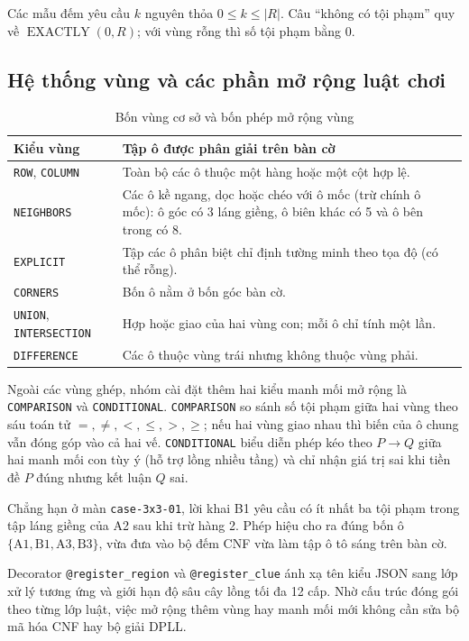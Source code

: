 Các mẫu đếm yêu cầu $k$ nguyên thỏa $0\le k\le |R|$. Câu “không có tội phạm” quy về $\operatorname{EXACTLY}(0,R)$; với vùng rỗng thì số tội phạm bằng 0.

\clearpage

\subsection{Hệ thống vùng và các phần mở rộng luật chơi}

\begin{table}[H]
\centering\small\singlespacing
\caption{Bốn vùng cơ sở và bốn phép mở rộng vùng}
\smallskip
\renewcommand{\arraystretch}{1.23}
\begin{tabularx}{\linewidth}{@{}l >{\raggedright\arraybackslash}X@{}}
\toprule
\textbf{Kiểu vùng} & \textbf{Tập ô được phân giải trên bàn cờ} \\
\midrule
\texttt{ROW}, \texttt{COLUMN} & Toàn bộ các ô thuộc một hàng hoặc một cột hợp lệ. \\
\texttt{NEIGHBORS} & Các ô kề ngang, dọc hoặc chéo với ô mốc (trừ chính ô mốc): ô góc có 3 láng giềng, ô biên khác có 5 và ô bên trong có 8. \\
\texttt{EXPLICIT} & Tập các ô phân biệt chỉ định tường minh theo tọa độ (có thể rỗng). \\
\texttt{CORNERS} & Bốn ô nằm ở bốn góc bàn cờ. \\
\texttt{UNION}, \texttt{INTERSECTION} & Hợp hoặc giao của hai vùng con; mỗi ô chỉ tính một lần. \\
\texttt{DIFFERENCE} & Các ô thuộc vùng trái nhưng không thuộc vùng phải. \\
\bottomrule
\end{tabularx}
\end{table}

Ngoài các vùng ghép, nhóm cài đặt thêm hai kiểu manh mối mở rộng là \texttt{COMPARISON} và \texttt{CONDITIONAL}. \texttt{COMPARISON} so sánh số tội phạm giữa hai vùng theo sáu toán tử $=,\ne,<,\le,>,\ge$; nếu hai vùng giao nhau thì biến của ô chung vẫn đóng góp vào cả hai vế. \texttt{CONDITIONAL} biểu diễn phép kéo theo $P\to Q$ giữa hai manh mối con tùy ý (hỗ trợ lồng nhiều tầng) và chỉ nhận giá trị sai khi tiền đề $P$ đúng nhưng kết luận $Q$ sai.

Chẳng hạn ở màn \texttt{case-3x3-01}, lời khai B1 yêu cầu có ít nhất ba tội phạm trong tập láng giềng của A2 sau khi trừ hàng 2. Phép hiệu cho ra đúng bốn ô $\{\mathrm{A1},\mathrm{B1},\mathrm{A3},\mathrm{B3}\}$, vừa đưa vào bộ đếm CNF vừa làm tập ô tô sáng trên bàn cờ.

Decorator \texttt{@register\_region} và \texttt{@register\_clue} ánh xạ tên kiểu JSON sang lớp xử lý tương ứng và giới hạn độ sâu cây lồng tối đa 12 cấp. Nhờ cấu trúc đóng gói theo từng lớp luật, việc mở rộng thêm vùng hay manh mối mới không cần sửa bộ mã hóa CNF hay bộ giải DPLL.

